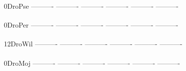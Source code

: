 \documentclass[11pt,twoside,reqno,a4paper]{article}
\begin{document}
{0\hspace*{4\charwidth}DroPse	----------	----------	----------	----------	----------	----------	\\
\hspace*{5\charwidth}\hspace*{7\charwidth}\hspace*{1\charwidth}\hspace*{1\charwidth}\hspace*{1\charwidth}\hspace*{1\charwidth}\hspace*{1\charwidth}\hspace*{1\charwidth}\\
0\hspace*{4\charwidth}DroPer	----------	----------	----------	----------	----------	----------	\\
\hspace*{5\charwidth}\hspace*{7\charwidth}\hspace*{1\charwidth}\hspace*{1\charwidth}\hspace*{1\charwidth}\hspace*{1\charwidth}\hspace*{1\charwidth}\hspace*{1\charwidth}\\
12\hspace*{3\charwidth}DroWil	----------	----------	----------	----------	----------	----------	\\
\hspace*{5\charwidth}\hspace*{7\charwidth}\hspace*{1\charwidth}\hspace*{1\charwidth}\hspace*{1\charwidth}\hspace*{1\charwidth}\hspace*{1\charwidth}\hspace*{1\charwidth}\\
0\hspace*{4\charwidth}DroMoj	----------	----------	----------	----------	----------	----------	\\
\hspace*{5\charwidth}\hspace*{7\charwidth}\hspace*{1\charwidth}\hspace*{1\charwidth}\hspace*{1\charwidth}\hspace*{1\charwidth}\hspace*{1\charwidth}\hspace*{1\charwidth}\\
}
\end{document}
